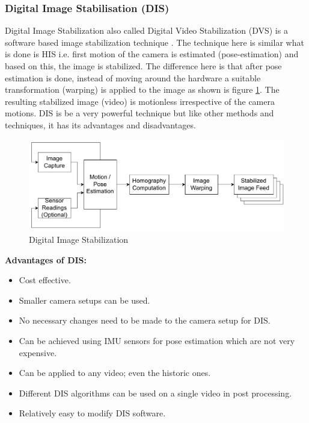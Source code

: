 \subsubsection{Digital Image Stabilisation (DIS)}
Digital Image Stabilization also called Digital Video Stabilization (DVS) is a software based image stabilization technique \citep{dis_review}. The technique here is similar what is done is HIS i.e. first motion of the camera is estimated (pose-estimation) and based on this, the image is stabilized. The difference here is that after pose estimation is done, instead of moving around the hardware a suitable transformation (warping) is applied to the image \citep{dis_feat_track} as shown is figure \ref{fig:dis}. The resulting stabilized image (video) is motionless irrespective of the camera motions. DIS is be a very powerful technique but like other methods and techniques, it has its advantages and disadvantages.

\begin{figure}
\centering
\includegraphics[scale=0.6]{images/fig_chapter2/2_1_dis.pdf}
\caption{Digital Image Stabilization}
\label{fig:dis}
\end{figure}

\textbf{Advantages of DIS: }
\begin{itemize}
\item Cost effective.
\item Smaller camera setups can be used.
\item No necessary changes need to be made to the camera setup for DIS.
\item Can be achieved using IMU sensors for pose estimation which are not very expensive.
\item Can be applied to any video; even the historic ones.
\item Different DIS algorithms can be used on a single video in post processing.
\item Relatively easy to modify DIS software.
\end{itemize}


